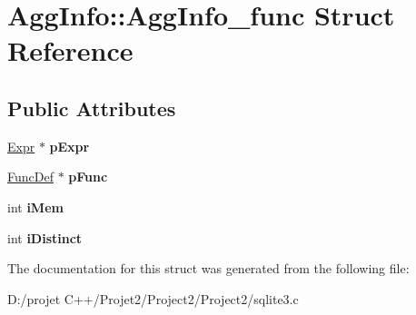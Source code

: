 \hypertarget{struct_agg_info_1_1_agg_info__func}{}\section{Agg\+Info\+:\+:Agg\+Info\+\_\+func Struct Reference}
\label{struct_agg_info_1_1_agg_info__func}
\subsection*{Public Attributes}
\begin{DoxyCompactItemize}
\item 
\mbox{\label{struct_agg_info_1_1_agg_info__func_a7b92e1c42e60d44e28ebf695316f4018}} 
\mbox{\hyperlink{struct_expr}{Expr}} $\ast$ {\bfseries p\+Expr}
\item 
\mbox{\label{struct_agg_info_1_1_agg_info__func_a840478e8ec53cefa57b50228f6fdafe4}} 
\mbox{\hyperlink{struct_func_def}{Func\+Def}} $\ast$ {\bfseries p\+Func}
\item 
\mbox{\label{struct_agg_info_1_1_agg_info__func_a41a8da36555c37fffc65f1acead49a4f}} 
int {\bfseries i\+Mem}
\item 
\mbox{\label{struct_agg_info_1_1_agg_info__func_a4a82635b0116eb44ec8ca9e47cc509d9}} 
int {\bfseries i\+Distinct}
\end{DoxyCompactItemize}


The documentation for this struct was generated from the following file\+:\begin{DoxyCompactItemize}
\item 
D\+:/projet C++/\+Projet2/\+Project2/\+Project2/sqlite3.\+c\end{DoxyCompactItemize}

